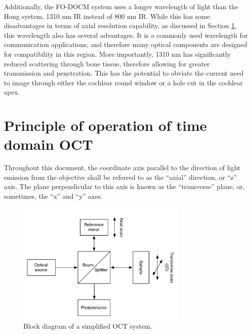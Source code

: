 Additionally, the FO-DOCM system uses a longer wavelength of light than the Hong system, 1310 nm IR instead of 800 nm IR. While this has some disadvantages in terms of axial resolution capability, as discussed in Section \ref{sec:principles_oct}, this wavelength also has several advantages. It is a commonly used wavelength for communication applications, and therefore many optical components are designed for compatibility in this region. More importantly, 1310 nm has significantly reduced scattering through bone tissue, therefore allowing for greater transmission and penetration. This has the potential to obviate the current need to image through either the cochlear round window or a hole cut in the cochlear apex. \cite{Sandell2011} \cite{Bashkatov2006}

\section{Principle of operation of time domain OCT}
\label{sec:principles_oct}


Throughout this document, the coordinate axis parallel to the direction of light emission from the objective shall be referred to as the ``axial'' direction, or ``z'' axis. The plane perpendicular to this axis is known as the ``transverse'' plane, or, sometimes, the ``x'' and ``y'' axes. %

\begin{figure}[h!]
  \centering
    \includegraphics[width=0.75\textwidth]{Images/Background/basic_oct_2.png}
      \caption{Block diagram of a simplified OCT system.\label{fig:basic_oct}}
\end{figure}

